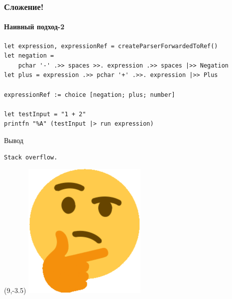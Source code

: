 \documentclass[xetex,mathserif,serif]{beamer}
\begin{document}
    \begin{frame}[fragile]
        \frametitle{Сложение!}
        \framesubtitle{Наивный подход-2}
        \begin{verbatim}
let expression, expressionRef = createParserForwardedToRef()
let negation = 
    pchar '-' .>> spaces >>. expression .>> spaces |>> Negation
let plus = expression .>> pchar '+' .>>. expression |>> Plus

expressionRef := choice [negation; plus; number]

let testInput = "1 + 2"
printfn "%A" (testInput |> run expression)
        \end{verbatim}

        \begin{exampleblock}{Вывод}
            \begin{verbatim}
Stack overflow.
            \end{verbatim}
        \end{exampleblock}
        \begin{textblock}{2}(9,-3.5)
            \includegraphics[width=\textwidth]{hmm.png}
        \end{textblock}
    \end{frame}
\end{document}
